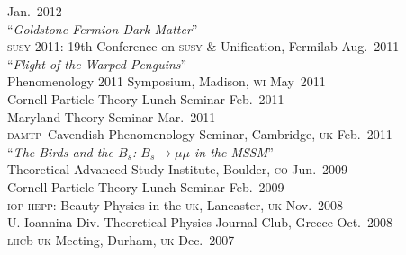\documentclass[margin,line]{resume}
\newcommand{\mytalksep}{-.1mm}
\newcommand{\mytalkskip}{2mm}
\newcommand{\scap}[1]{\textsc{\MakeLowercase{#1}}}
\begin{document}
\begin{resume}
\hfill %
Jan.~2012\vspace{\mytalkskip}\\ 
%
%
%
``\emph{Goldstone Fermion Dark Matter}'' 
\vspace{\mytalksep}\\ 
\scap{SUSY} 2011: 19th Conference on \scap{SUSY} \& Unification, Fermilab
\hfill %
Aug.~2011\vspace{\mytalkskip}\\ 
%
%
%
``\emph{Flight of the Warped Penguins}'' 
\vspace{\mytalksep}\\ 
Phenomenology 2011 Symposium, Madison, \scap{WI}
\hfill %
May~2011\vspace{\mytalksep}\\ 
Cornell Particle Theory Lunch Seminar
\hfill %
Feb.~2011\vspace{\mytalksep}\\   
%
Maryland Theory Seminar
\hfill %
Mar.~2011\vspace{\mytalksep}\\   
%
\scap{DAMTP}--Cavendish Phenomenology Seminar, Cambridge, \scap{UK}
\hfill %
Feb.~2011\vspace{\mytalkskip}\\
%
%
%
%
%
%
``\emph{The Birds and the $B_s$: $B_s \to \mu\mu$ in the MSSM}'' 
\vspace{\mytalksep}\\ 
Theoretical Advanced Study Institute, Boulder, \scap{CO}
\hfill %
Jun.~2009\vspace{\mytalksep}\\ 
%
Cornell Particle Theory Lunch Seminar
\hfill %
Feb.~2009\vspace{\mytalksep}\\   
%
\scap{IOP HEPP}: Beauty Physics in the \scap{UK}, Lancaster, \scap{UK}
\hfill %
Nov.~2008\vspace{\mytalksep}\\ 
%
U. Ioannina Div. Theoretical Physics Journal Club, Greece
\hfill %
Oct.~2008\vspace{\mytalksep}\\
%
\scap{LHC}b \scap{UK} Meeting, Durham, \scap{UK}
\hfill %
Dec.~2007%
%
%
%







\end{resume}
\end{document}
